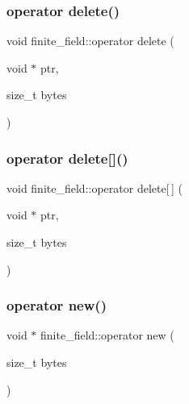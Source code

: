 \subsubsection{\texorpdfstring{operator delete()}{operator delete()}}
{\footnotesize\ttfamily void finite\+\_\+field\+::operator delete (\begin{DoxyParamCaption}\item[{void $\ast$}]{ptr,  }\item[{size\+\_\+t}]{bytes }\end{DoxyParamCaption})}

\mbox{\label{classfinite__field_a5905465b6cb57fbc0dd32740903ad2e5}} 
\subsubsection{\texorpdfstring{operator delete[]()}{operator delete[]()}}
{\footnotesize\ttfamily void finite\+\_\+field\+::operator delete\mbox{[}$\,$\mbox{]} (\begin{DoxyParamCaption}\item[{void $\ast$}]{ptr,  }\item[{size\+\_\+t}]{bytes }\end{DoxyParamCaption})}

\mbox{\label{classfinite__field_a5f85af83c9bb1107259f776e55f001bc}} 
\subsubsection{\texorpdfstring{operator new()}{operator new()}}
{\footnotesize\ttfamily void $\ast$ finite\+\_\+field\+::operator new (\begin{DoxyParamCaption}\item[{size\+\_\+t}]{bytes }\end{DoxyParamCaption})}

\mbox{\label{classfinite__field_adf3ff56d45f8d0490f6568f8ebebe578}} 
